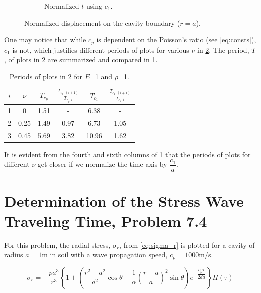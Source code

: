 \documentclass{article}
\begin{document}
\begin{figure}[H]
\begin{subfigure}{0.49\textwidth}
            \caption{Normalized $t$ using $c_1$.}
            \label{fig:u_0_c_1}
        \end{subfigure}
    \caption{Normalized displacement on the cavity boundary ($r = a$).}
    \label{fig:u_0_c}
\end{figure}

One may notice that while $c_p$ is dependent on the Poisson's ratio (see \cref{eq:consts}), $c_1$ is not, which justifies different periods of plots for various $\nu$ in \cref{fig:u_0_c}. The period, $T$, of plots in \cref{fig:u_0_c} are summarized and compared in \cref{tab:period}. 

\begin{table}[H]
    \centering
    \begin{tabular}{c c c c c c} \hline
        $i$ & $\nu$ & $T_{c_p}$ & $\frac{T_{c_p,(i+1)}}{T_{c_p,i}}$ & $T_{c_1}$ & $\frac{T_{c_1,(i+1)}}{T_{c_1,i}}$ \\ \hline
        1 & 0 & 1.51 & - & 6.38 & - \\
        2 & 0.25 & 1.49 & 0.97 & 6.73 & 1.05 \\
        3 & 0.45 & 5.69 & 3.82 & 10.96 & 1.62 \\ \hline
    \end{tabular} 
    \caption{Periods of plots in \cref{fig:u_0_c} for $E$=1 and $\rho$=1.}
    \label{tab:period}
\end{table}

It is evident from the fourth and sixth columns of \cref{tab:period} that the periods of plots for different $\nu$ get closer if we normalize the time axis by $\dfrac{c_1}{a}$.

\section{Determination of the Stress Wave Traveling Time, Problem 7.4}
For this problem, the radial stress, $\sigma_r$, from \cref{eq:sigma_r} is plotted for a cavity of radius $a=1$m in soil with a wave propagation speed, $c_p=1000$m/s. 

\begin{equation}
    \sigma_r = -\frac{pa^3}{r^3} \left \{ 1 + \left( \frac{r^2 - a^2}{a^2}\cos\theta - \frac{1}{\alpha} \left(\frac{r-a}{a}\right)^2 \sin\theta \right) e^{-\dfrac{c_p\tau}{2da}} \right \} H(\tau)
    \label{eq:sigma_r}
\end{equation}
\end{document}
